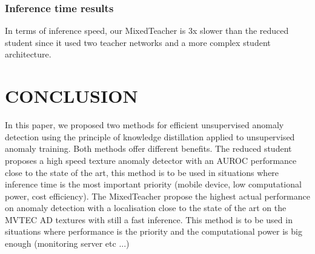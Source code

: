 \documentclass[a4paper,twoside]{article}
\begin{document}
\begin{table}[h]
	\centering
    \captionsetup{justification=centering}
	\caption{\textbf{Image-AUROC comparison on BTAD: MixedTeacher}}
	\footnotesize
	\setlength{\tabcolsep}{13pt}
	\renewcommand{\arraystretch}{1.3}
\end{table}

\subsubsection{Inference time results}
In terms of inference speed, our MixedTeacher is 3x slower than the reduced student since it used two teacher networks and a more complex student architecture.

\section{CONCLUSION}
In this paper, we proposed two methods for efficient unsupervised anomaly detection using the principle of knowledge distillation applied to unsupervised anomaly training. Both methods offer different benefits. The reduced student proposes a high speed texture anomaly detector with an AUROC performance close to the state of the art, this method is to be used in situations where inference time is the most important priority (mobile device, low computational power, cost efficiency). The MixedTeacher propose the highest actual performance on anomaly detection with a localisation close to the state of the art on the MVTEC AD textures with still a fast inference. This method is to be used in situations where performance is the priority and the computational power is big enough (monitoring server etc ...)


\small
\printbibliography
\end{document}
